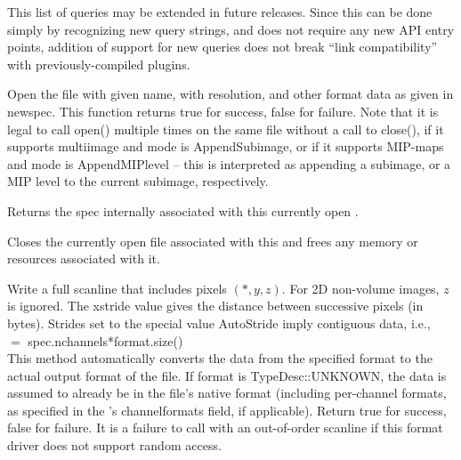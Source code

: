 \noindent This list of queries may be extended in future releases.
Since this can be done simply by recognizing new query strings, and does
not require any new API entry points, addition of support for new
queries does not break ``link compatibility'' with previously-compiled
plugins.
\apiend


Open the file with given {\kw name}, with resolution, and other format
data as given in {\kw newspec}.  This function returns {\kw true} for
success, {\kw false} for failure.  Note that it is legal to call 
{\kw open()} multiple times on the same file without a call to
{\kw close()}, if it supports multiimage and {\kw mode} is 
{\kw AppendSubimage}, or if it supports MIP-maps and {\kw mode} is 
{\kw AppendMIPlevel} -- this is interpreted as appending a subimage, or
a MIP level to the current subimage, respectively.

\apiend

Returns the spec internally associated with this currently open
\ImageOutput.
\apiend

Closes the currently open file associated with this \ImageOutput
and frees any memory or resources associated with it.
\apiend


Write a full scanline that includes pixels $(*,y,z)$.  For 2D non-volume
images, $z$ is ignored.  The {\kw xstride} value gives the distance
between successive pixels (in bytes).  Strides set to the special value
{\kw AutoStride} imply contiguous data, i.e., \\  $=$
{\kw spec.nchannels*format.size()} \\ This method
automatically converts the data from the specified {\kw format} to the
actual output format of the file.  
If {\cf format} is {\cf TypeDesc::UNKNOWN}, the data is assumed to
already be in the file's native format (including per-channel formats, 
as specified in the \ImageSpec's {\cf channelformats} field, if applicable).
Return {\kw true} for success, {\kw
  false} for failure.  It is a failure to call \writescanline with an
out-of-order scanline if this format driver does not support random
access.

